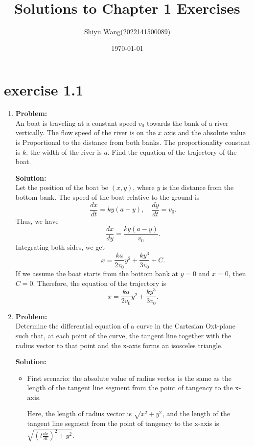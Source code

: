 \documentclass[12pt]{article}
\title{Solutions to Chapter 1 Exercises}
\author{Shiyu Wang(2022141500089)}
\date{\today}
\begin{document}
\maketitle

\section{exercise 1.1}

\begin{enumerate}[label=\textbf{Exercise \arabic*:}]
    \item
    \textbf{Problem:} \\
    An boat is traveling at a constant speed $v_0$ towards the bank of a river vertically. The flow speed of the river is on the 
    $x$ axis and the absolute value is Proportional to the distance from both banks. The proportionality constant is $k$. 
    the width of the river is $a$. Find the equation of the trajectory of the boat.

    \textbf{Solution:} \\
    Let the position of the boat be $(x,y)$, where $y$ is the distance from the bottom bank. The speed of the boat relative to the ground is
    \[\frac{dx}{dt} = ky(a-y), \quad \frac{dy}{dt} = v_0.\]
    Thus, we have
    \[\frac{dx}{dy} = \frac{ky(a-y)}{v_0}.\]
    Integrating both sides, we get
    \[x = \frac{ka}{2v_0}y^2 +\frac{ky^3}{3v_0} + C.\]
    If we assume the boat starts from the bottom bank at $y=0$ and $x=0$, then $C=0$. Therefore, the equation of the trajectory is
    \[x = \frac{ka}{2v_0}y^2 +\frac{ky^3}{3v_0}.\]

    \item
    \textbf{Problem:} \\
    Determine the differential equation of a curve in the Cartesian Oxt-plane such that,
     at each point of the curve, the tangent line together with the radius vector 
     to that point and the x-axis forms an isosceles triangle.


    \textbf{Solution:} \\
    
    \begin{itemize}
        \item First scenario: the absolute value of radius vector is the same as the length 
        of the tangent line segment from the point of tangency to the x-axis.

        Here, the length of radius vector is $\sqrt{x^2 + y^2}$, and the length of the tangent 
        line segment from the point of tangency to the x-axis is $\sqrt{(t\frac{dx}{dt})^2+y^2}$.


\end{itemize}
\end{enumerate}
\end{document}
